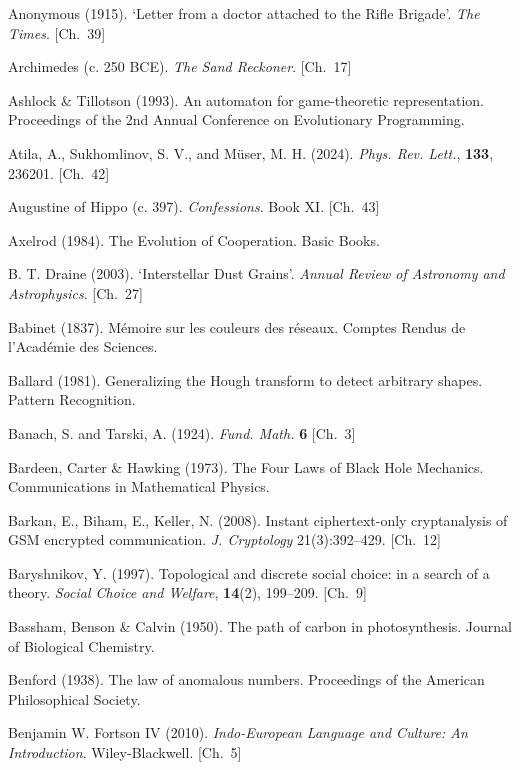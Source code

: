 \begin{list}{}{%
  \setlength{\leftmargin}{2em}%
  \setlength{\itemindent}{-2em}%
  \setlength{\itemsep}{0.35\baselineskip}%
  \setlength{\parsep}{0pt}%
  \setlength{\topsep}{0.5em}}
\item Anonymous (1915). `Letter from a doctor attached to the Rifle Brigade'. \textit{The Times}. \hfill {\scriptsize [Ch.~39]}
\item Archimedes (c. 250 BCE). \textit{The Sand Reckoner}. \hfill {\scriptsize [Ch.~17]}
\item Ashlock \& Tillotson (1993). An automaton for game-theoretic representation. Proceedings of the 2nd Annual Conference on Evolutionary Programming.
\item Atila, A., Sukhomlinov, S. V., and M\"{u}ser, M. H. (2024). \textit{Phys. Rev. Lett.}, \textbf{133}, 236201. \hfill {\scriptsize [Ch.~42]}
\item Augustine of Hippo (c. 397). \textit{Confessions}. Book XI. \hfill {\scriptsize [Ch.~43]}
\item Axelrod (1984). The Evolution of Cooperation. Basic Books.
\item B. T. Draine (2003). `Interstellar Dust Grains'. \textit{Annual Review of Astronomy and Astrophysics}. \hfill {\scriptsize [Ch.~27]}
\item Babinet (1837). Mémoire sur les couleurs des réseaux. Comptes Rendus de l'Académie des Sciences.
\item Ballard (1981). Generalizing the Hough transform to detect arbitrary shapes. Pattern Recognition.
\item Banach, S. and Tarski, A. (1924). \textit{Fund. Math.} \textbf{6} \hfill {\scriptsize [Ch.~3]}
\item Bardeen, Carter \& Hawking (1973). The Four Laws of Black Hole Mechanics. Communications in Mathematical Physics.
\item Barkan, E., Biham, E., Keller, N. (2008). Instant ciphertext-only cryptanalysis of GSM encrypted communication. \textit{J. Cryptology} 21(3):392–429. \hfill {\scriptsize [Ch.~12]}
\item Baryshnikov, Y. (1997). Topological and discrete social choice: in a search of a theory. \textit{Social Choice and Welfare}, \textbf{14}(2), 199–209. \hfill {\scriptsize [Ch.~9]}
\item Bassham, Benson \& Calvin (1950). The path of carbon in photosynthesis. Journal of Biological Chemistry.
\item Benford (1938). The law of anomalous numbers. Proceedings of the American Philosophical Society.
\item Benjamin W. Fortson IV (2010). \textit{Indo-European Language and Culture: An Introduction}. Wiley-Blackwell. \hfill {\scriptsize [Ch.~5]}

\end{list}
